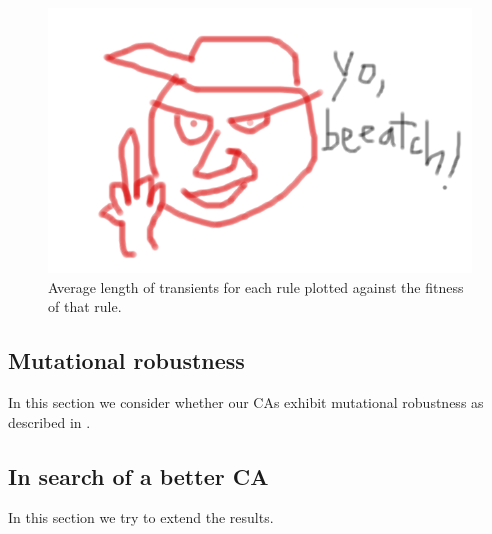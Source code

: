 \begin{figure}
\begin{center}
\includegraphics[width=\linewidth]{foo.png}
\caption{Average length of transients for each rule plotted against the fitness of that rule.}
\label{fig:r2_best_fit}
\end{center}
\end{figure}

\subsection{Mutational robustness} \label{sec:2_2}

In this section we consider whether our CAs exhibit mutational robustness as described in \cite{wagner_role_2012}.

\subsection{In search of a better CA} \label{sec:2_3}

In this section we try to extend the results.



